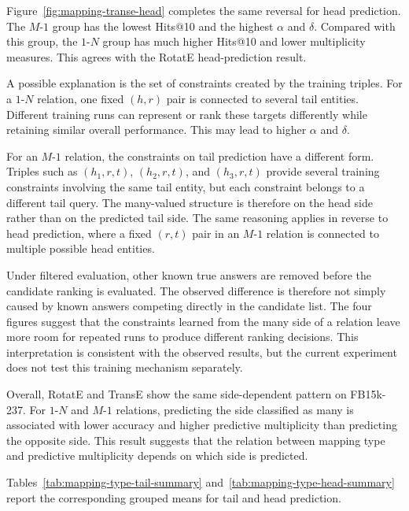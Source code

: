 Figure~\ref{fig:mapping-transe-head} completes the same reversal for head
prediction. The \(M\)-\(1\) group has the lowest Hits@10 and the highest
\(\alpha\) and \(\delta\). Compared with this group, the \(1\)-\(N\) group has
much higher Hits@10 and lower multiplicity measures. This agrees with the
RotatE head-prediction result.

A possible explanation is the set of constraints created by the training
triples. For a \(1\)-\(N\) relation, one fixed \((h,r)\) pair is connected to
several tail entities. Different training runs can represent or rank these
targets differently while retaining similar overall performance. This may lead
to higher \(\alpha\) and \(\delta\).

For an \(M\)-\(1\) relation, the constraints on tail prediction have a
different form. Triples such as \((h_1,r,t)\), \((h_2,r,t)\), and
\((h_3,r,t)\) provide several training constraints involving the same tail
entity, but each constraint belongs to a different tail query. The many-valued
structure is therefore on the head side rather than on the predicted tail side.
The same reasoning applies in reverse to head prediction, where a fixed
\((r,t)\) pair in an \(M\)-\(1\) relation is connected to multiple possible
head entities.

Under filtered evaluation, other known true answers are removed before the
candidate ranking is evaluated. The observed difference is therefore not
simply caused by known answers competing directly in the candidate list. The
four figures suggest that the constraints learned from the many side of
a relation leave more room for repeated runs to produce different ranking
decisions. This interpretation is consistent with the observed results, but
the current experiment does not test this training mechanism separately.

Overall, RotatE and TransE show the same side-dependent pattern on FB15k-237.
For \(1\)-\(N\) and \(M\)-\(1\) relations, predicting the side classified as
many is associated with lower accuracy and higher predictive multiplicity than
predicting the opposite side. This result suggests that the relation between
mapping type and predictive multiplicity depends on which side is predicted.

Tables~\ref{tab:mapping-type-tail-summary}
and~\ref{tab:mapping-type-head-summary} report the corresponding grouped means
for tail and head prediction.

